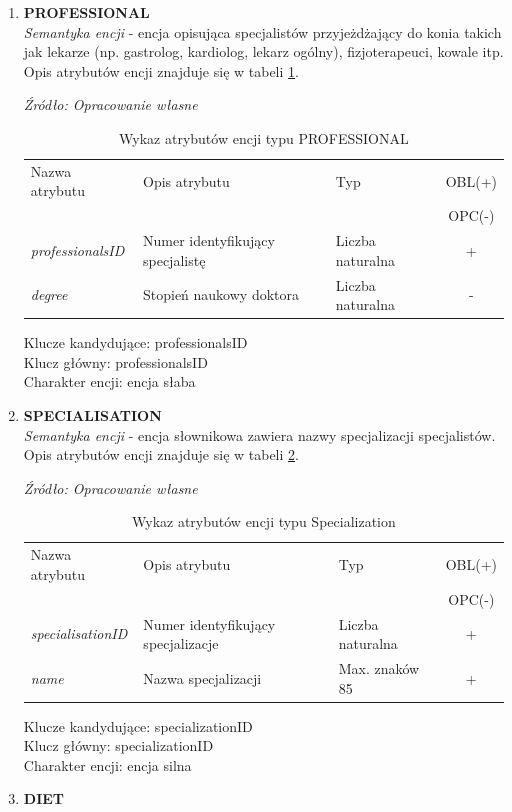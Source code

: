 \documentclass[12pt,oneside]{report}
\begin{document}
\begin{enumerate}[start=1,label={\bfseries ENC\textbackslash0\arabic*}]
	\item \textbf{PROFESSIONAL}\\
	\textit{Semantyka encji} - encja opisująca specjalistów przyjeżdżający do konia takich jak lekarze (np. gastrolog, kardiolog, lekarz ogólny), fizjoterapeuci, kowale itp.
	\\
Opis atrybutów encji znajduje się w tabeli \ref{ProfessionalsAtribute}.

	\begin{table}[H]		
		\caption{Wykaz atrybutów encji typu PROFESSIONAL }
		\textit{Źródło: Opracowanie własne}
		\label{ProfessionalsAtribute}
		\centering
		\begin{tabular}{|l|l|l|c|}
			\hline
			Nazwa atrybutu & Opis atrybutu & Typ & OBL(+) \\
			& & &  OPC(-) \\
			\hline
			\textit{professionalsID} & Numer identyfikujący specjalistę & Liczba naturalna & + \\
			\hline			
			\textit{degree} & Stopień naukowy doktora & Liczba naturalna & - \\
			\hline
		\end{tabular}

	\end{table}
	Klucze kandydujące: professionalsID \\
	Klucz główny: professionalsID \\
	Charakter encji: encja słaba 
	\item \textbf{SPECIALISATION}\\
	\textit{Semantyka encji} - encja słownikowa zawiera nazwy specjalizacji specjalistów.
	\\
	Opis atrybutów encji znajduje się w tabeli \ref{SpecialisationAtribute}.
	
	\begin{table}[H]
		\caption{Wykaz atrybutów encji typu Specialization}
		\textit{Źródło: Opracowanie własne}
		\label{SpecialisationAtribute}
		\centering
		\begin{tabular}{|l|l|l|c|}
			\hline
			Nazwa atrybutu & Opis atrybutu & Typ & OBL(+) \\
			& & &  OPC(-) \\
			\hline
			\textit{specialisationID} & Numer identyfikujący specjalizacje & Liczba naturalna & + \\
			\hline
			\textit{name} & Nazwa specjalizacji & Max. znaków 85 & + \\
			\hline
		\end{tabular}
	\end{table}
	Klucze kandydujące: specializationID \\
	Klucz główny: specializationID \\
	Charakter encji: encja silna \\
	\newpage
	\item \textbf{DIET}
	

\end{enumerate}
\end{document}
